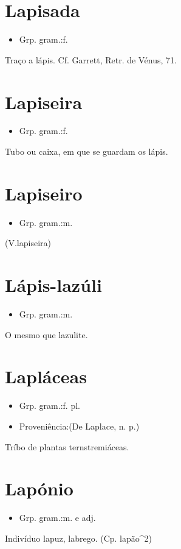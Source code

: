 \section{Lapisada}
\begin{itemize}
\item {Grp. gram.:f.}
\end{itemize}
Traço a lápis. Cf. Garrett, \textunderscore Retr. de Vénus\textunderscore , 71.
\section{Lapiseira}
\begin{itemize}
\item {Grp. gram.:f.}
\end{itemize}
Tubo ou caixa, em que se guardam os lápis.
\section{Lapiseiro}
\begin{itemize}
\item {Grp. gram.:m.}
\end{itemize}
(V.lapiseira)
\section{Lápis-lazúli}
\begin{itemize}
\item {Grp. gram.:m.}
\end{itemize}
O mesmo que \textunderscore lazulite\textunderscore .
\section{Lapláceas}
\begin{itemize}
\item {Grp. gram.:f. pl.}
\end{itemize}
\begin{itemize}
\item {Proveniência:(De \textunderscore Laplace\textunderscore , n. p.)}
\end{itemize}
Tríbo de plantas ternstremiáceas.
\section{Lapónio}
\begin{itemize}
\item {Grp. gram.:m.  e  adj.}
\end{itemize}
Indivíduo lapuz, labrego.
(Cp. \textunderscore lapão\textunderscore ^2)
